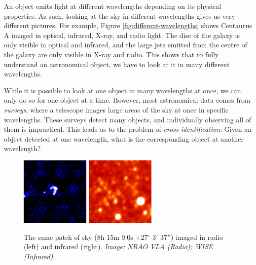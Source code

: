 An object emits light at different wavelengths depending on its physical
properties. As such, looking at the sky in different wavelengths gives us very
different pictures. For example, Figure \ref{fig:different-wavelengths} shows
Centaurus A imaged in optical, infrared, X-ray, and radio light. The disc of
the galaxy is only visible in optical and infrared, and the large jets emitted
from the centre of the galaxy are only visible in X-ray and radio. This shows
that to fully understand an astronomical object, we have to look at it in many
different wavelengths.

While it is possible to look at one object in many wavelengths at once, we can
only do so for one object at a time. However, most astronomical data comes from
\emph{surveys}, where a telescope images large areas of the sky at once in
specific wavelengths. These surveys detect many objects, and individually
observing all of them is impractical. This leads us to the problem of
\emph{cross-identification}: Given an object detected at one wavelength, what
is the corresponding object at another wavelength?

\begin{figure}
  \centering
  \includegraphics[width=0.3\textwidth]{images/first_FIRSTJ081509.0+270337.jpg}
  \includegraphics[width=0.3\textwidth]{images/wise_FIRSTJ081509.0+270337.jpg}
  \caption{The same patch of sky (8h 15m 9.0s +27$^\circ$ 3$'$ 37$''$) imaged in
    radio (left) and infrared (right). \emph{Image: NRAO VLA (Radio); WISE
    (Infrared)}}
  \label{fig:radio-ir-comparison}
\end{figure}

